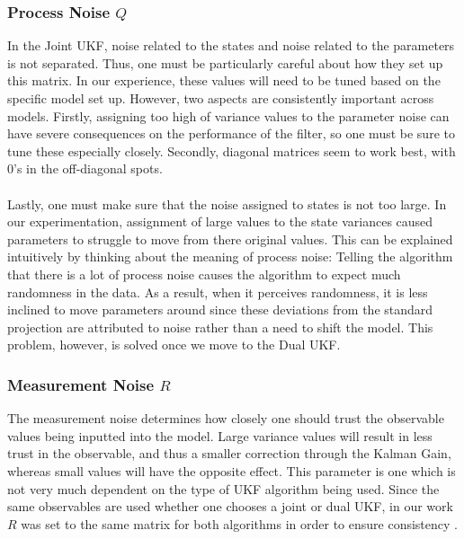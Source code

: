 \documentclass{article}
\begin{document}
\subsubsection{Process Noise $Q$}
In the Joint UKF, noise related to the states and noise related to the parameters is not separated. Thus, one must be particularly careful about how they set up this matrix. In our experience, these values will need to be tuned based on the specific model set up. However, two aspects are consistently important across models. Firstly, assigning too high of variance values to the parameter noise can have severe consequences on the performance of the filter, so one must be sure to tune these especially closely. Secondly, diagonal matrices seem to work best, with 0's in the off-diagonal spots. \\
\\
Lastly, one must make sure that the noise assigned to states is not too large. In our experimentation, assignment of large values to the state variances caused parameters to struggle to move from there original values. This can be explained intuitively by thinking about the meaning of process noise: Telling the algorithm that there is a lot of process noise causes the algorithm to expect much randomness in the data. As a result, when it perceives randomness, it is less inclined to move parameters around since these deviations from the standard projection are attributed to noise rather than a need to shift the model. This problem, however, is solved once we move to the Dual UKF.

\subsubsection{Measurement Noise $R$}
The measurement noise determines how closely one should trust the observable values being inputted into the model. Large variance values will result in less trust in the observable, and thus a smaller correction through the Kalman Gain, whereas small values will have the opposite effect. This parameter is one which is not very much dependent on the type of UKF algorithm being used. Since the same observables are used whether one chooses a joint or dual UKF, in our work $R$ was set to the same matrix for both algorithms in order to ensure consistency \cite{GoveHollingerDual}. 
\end{document}
